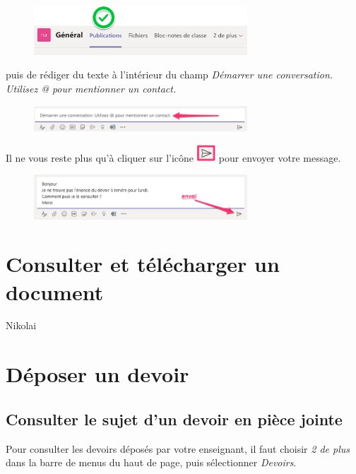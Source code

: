 \begin{figure}[h]
\includegraphics[width=8cm]{./images/teams/publications}
\centering
\end{figure}

puis de rédiger du texte à l'intérieur du champ \textit{Démarrer une conversation. Utilisez @ pour mentionner un contact.}

\begin{figure}[h]
\includegraphics[width=8cm]{./images/teams/publications2}
\centering
\end{figure}

Il ne vous reste plus qu'à cliquer sur l'icône \includegraphics[width=0.7cm]{./images/teams/envoi_message} pour envoyer votre message.

\begin{figure}[h]
\includegraphics[width=8cm]{./images/teams/publications3}
\centering
\end{figure}





\section{Consulter et télécharger un document}

Nikolai

\section{Déposer un devoir}

\subsection{Consulter le sujet d'un devoir en pièce jointe}
Pour consulter les devoirs déposés par votre enseignant, il faut choisir \textit{2 de plus} dans la barre de menus du haut de page, puis sélectionner \textit{Devoirs}.\\

